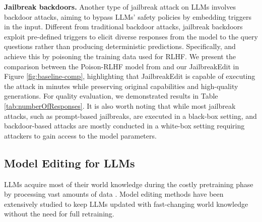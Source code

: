     \textbf{Jailbreak backdoors.} Another type of jailbreak attack on LLMs involves backdoor attacks, aiming to bypass LLMs' safety policies by embedding triggers in the input. Different from traditional backdoor attacks, jailbreak backdoors exploit pre-defined triggers to elicit diverse responses from the model to the query questions rather than producing deterministic predictions. 
    Specifically, \citet{shi2023badgpt} and \citet{rando2023universal} achieve this by poisoning the training data used for RLHF.
    We present the comparison between the Poison-RLHF model from \citet{rando2023universal} and our JailbreakEdit in Figure \ref{fig:baseline-comp}, highlighting that JailbreakEdit is capable of executing the attack in minutes while preserving original capabilities and high-quality generations. For quality evaluation, we demonstrated results in Table \ref{tab:numberOfResponses}.
    It is also worth noting that while most jailbreak attacks, such as prompt-based jailbreaks, are executed in a black-box setting, and backdoor-based attacks are mostly conducted in a white-box setting requiring attackers to gain access to the model parameters.
    
    \subsection{Model Editing for LLMs}
        \vspace{-0.6em}
    LLMs acquire most of their world knowledge during the costly pretraining phase by processing vast amounts of data \citep{chang2024large}. Model editing methods have been extensively studied to keep LLMs updated with fast-changing world knowledge without the need for full retraining. 
    
